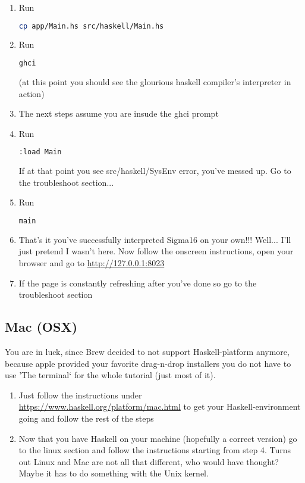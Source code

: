\documentclass[11pt,a4paper]{article}
\begin{document}
\begin{enumerate}
   \item Run
\begin{lstlisting}[language=Bash]
cp app/Main.hs src/haskell/Main.hs
\end{lstlisting}
   \item Run 
\begin{lstlisting}[language=Bash]
ghci
\end{lstlisting} (at this point you should see the glourious haskell compiler's interpreter in action)
   \item The next steps assume you are insude the ghci prompt
   \item Run 
\begin{lstlisting}[language=Bash]
:load Main
\end{lstlisting}
If at that point you see src/haskell/SysEnv error, you've messed up. Go to the troubleshoot section...
   \item Run 
\begin{lstlisting}[language=Bash]
main
\end{lstlisting}
   \item That's it you've successfully interpreted Sigma16 on your own!!! Well... I'll just pretend I wasn't here. Now follow the onscreen instructions, open your browser and go to \url{http://127.0.0.1:8023}
   \item If the page is constantly refreshing after you've done so go to the troubleshoot section

 \end{enumerate}

\subsection{Mac (OSX)}
You are in luck, since Brew decided to not support Haskell-platform anymore, because apple provided your favorite drag-n-drop installers you do not have to use 'The terminal` for the whole tutorial (just most of it).
\begin{enumerate}
    \item Just follow the instructions under \url{https://www.haskell.org/platform/mac.html} to get your Haskell-environment going and follow the rest of the steps
    \item Now that you have Haskell on your machine (hopefully a correct version) go to the linux section and follow the instructions starting from step 4. Turns out Linux and Mac are not all that different, who would have thought? Maybe it has to do something with the Unix kernel.
\end{enumerate}
\end{document}
